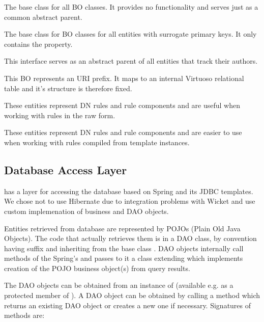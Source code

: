\begin{description}[style=nextline,font=\ttfamily]
	\item[BusinessEntity] The base class for all BO classes. It provides no functionality and serves just as a common abstract parent.
	\item[EntityWithSurrogateKey] The base class for BO classes for all entities with surrogate primary keys. It only contains the  property.
	\item[AuthoredEntity] This interface serves as an abstract parent of all entities that track their authors.
	\item[Prefix] This BO represents an URI prefix. It maps to an internal Virtuoso relational table and it's structure is therefore fixed.
	\item[DNRule and DNRuleComponent] These entities represent DN rules and rule components and are useful when working with rules in the raw form.
	\item[CompiledDNRule and CompiledDNRuleComponent] These entities represent DN rules and rule components and are easier to use when working with rules compiled from template instances.

\subsubsection{}



\subsection{Database Access Layer}
\FE has a layer for accessing the database based on Spring and its JDBC templates. We chose not to use Hibernate due to integration problems with Wicket and use custom implemenation of business and DAO objects.

Entities retrieved from database are represented by POJOs (Plain Old Java Objects). The code that actually retrieves them is in a DAO class, by convention having suffix  and inheriting from the base class . DAO objects internally call methods of the Spring's  and passes to it a class extending  which implements creation of the POJO business object(s) from query results.

The DAO objects can be obtained from an instance of  (available e.g. as a protected member of ). A DAO object can be obtained by calling a  method which returns an existing DAO object or creates a new one if necessary. Signatures of  methods are:


\end{description}
